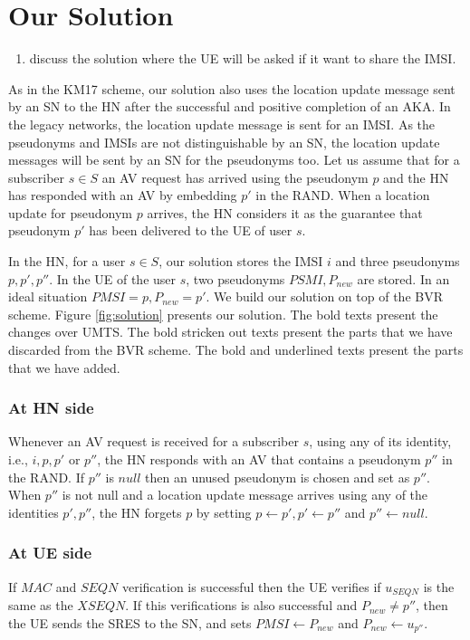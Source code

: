 \documentclass{llncs} %
\begin{document}
\section{Our Solution}
\begin{enumerate}
 \item discuss the solution where the UE will be asked if it want to share the IMSI.
\end{enumerate}
As in the KM17 scheme, our solution also uses the location update message sent by an SN to the HN after the successful and positive completion of an AKA. In the legacy networks, the location update message is sent for an IMSI. As the pseudonyms and IMSIs are not distinguishable by an SN, the location update messages will be sent by an SN for the pseudonyms too. Let us assume that for a subscriber $s \in S$ an AV request has arrived using the pseudonym $p$ and the HN has responded with an AV by embedding $p'$ in the RAND. When a location update for pseudonym $p$ arrives, the HN considers it as the guarantee that pseudonym $p'$ has been delivered to the UE of user $s$.

In the HN, for a user $s \in S$, our solution stores the IMSI $i$ and three pseudonyms $p,p',p''$. In the UE of the user $s$, two pseudonyms $PSMI,P_{new}$ are stored. In an ideal situation $PMSI = p, P_{new} = p'$. We build our solution on top of the BVR scheme. Figure \ref{fig:solution} presents our solution. The bold texts present the changes over UMTS. The bold stricken out texts present the parts that we have discarded from the BVR scheme. The bold and underlined texts present the parts that we have added. 


\subsubsection{At HN side}
Whenever an AV request is received for a subscriber $s$, using any of its identity, i.e., $i,p,p'$ or $p''$, the HN responds with an AV that contains a pseudonym $p''$ in the RAND. If $p''$ is $null$ then an unused pseudonym is chosen and set as $p''$. When $p''$ is not null and a location update message arrives using any of the identities $p',p''$, the HN forgets $p$ by setting $p \leftarrow p', p' \leftarrow p''$ and $p'' \leftarrow null$. 


\subsubsection{At UE side}
If $MAC$ and $SEQN$ verification is successful then the UE verifies if $u_{SEQN}$ is the same as the $XSEQN$. If this verifications is also successful and $P_{new} \neq p''$, then the UE sends the SRES to the SN, and sets $PMSI \leftarrow P_{new}$ and $P_{new} \leftarrow u_{p''}$.
\end{document}
